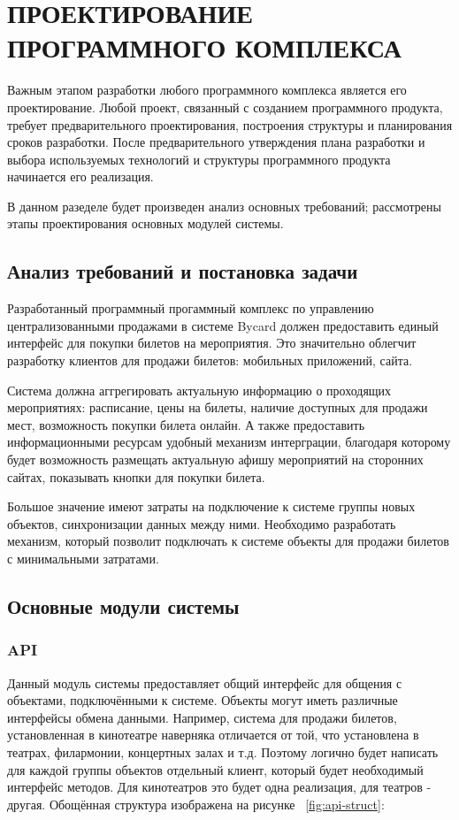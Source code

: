 \section{ПРОЕКТИРОВАНИЕ ПРОГРАММНОГО КОМПЛЕКСА}

Важным этапом разработки любого программного комплекса является его проектирование. Любой проект, связанный с созданием программного продукта, требует предварительного проектирования, построения структуры и планирования сроков разработки. После предварительного утверждения плана разработки и выбора используемых технологий и структуры программного продукта начинается его реализация.

В данном разеделе будет произведен анализ основных требований; рассмотрены этапы проектирования основных модулей системы.

\subsection{Анализ требований и постановка задачи}

Разработанный программный прогаммный комплекс по управлению централизованными продажами в системе Bycard должен предоставить единый интерфейс для покупки билетов на мероприятия. Это значительно облегчит разработку клиентов для продажи билетов: мобильных приложений, сайта.

Система должна аггрегировать актуальную информацию о проходящих мероприятиях: расписание, цены на билеты, наличие доступных для продажи мест, возможность покупки билета онлайн. А также предоставить информационными ресурсам удобный механизм интерграции, благодаря которому будет возможность размещать актуальную афишу мероприятий на сторонних сайтах, показывать кнопки для покупки билета.

Большое значение имеют затраты на подключение к системе группы новых объектов, синхронизации данных между ними. Необходимо разработать механизм, который позволит подключать к системе объекты для продажи билетов с минимальными затратами.

\subsection{Основные модули системы}

\subsubsection{API}

Данный модуль системы предоставляет общий интерфейс для общения с объектами, подключёнными к системе. Объекты могут иметь различные интерфейсы обмена данными. Например, система для продажи билетов, установленная в кинотеатре наверняка отличается от той, что установлена в театрах, филармонии, концертных залах и т.д. Поэтому логично будет написать для каждой группы объектов отдельный клиент, который будет необходимый интерфейс методов. Для кинотеатров это будет одна реализация, для театров - другая. Обощённая структура изображена на рисунке ~\ref{fig:api-struct}:

